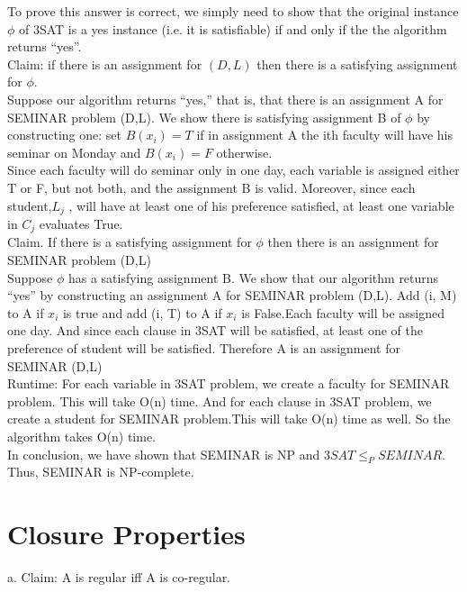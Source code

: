\documentclass[12pt]{article}
\begin{document}
To prove this answer is correct, we simply need to show that the original instance $\phi$ of 3SAT is a yes instance (i.e. it is satisfiable) if and only if the the algorithm returns “yes”.\\

Claim: if there is an assignment for $(D,L)$ then there is a satisfying assignment for $\phi$.\\
Suppose our algorithm returns “yes,” that is, that there is an assignment A for SEMINAR problem (D,L). We show there is satisfying assignment B of $\phi$ by constructing one: set $B(x_i) = T $ if in assignment A the ith faculty will have his seminar on Monday and $B(x_i) = F$ otherwise.\\
Since each faculty will do seminar only in one day, each variable is assigned either T or F, but not both, and the assignment B is valid. Moreover, since each student,$L_j$ , will have at least one of his preference satisfied, at least one variable in $C_j$ evaluates True.\\


Claim. If there is a satisfying assignment for $\phi$ then there is an assignment for SEMINAR problem (D,L)\\
Suppose $\phi$ has a satisfying assignment B. We show that our algorithm returns “yes” by constructing an assignment A for SEMINAR problem (D,L). Add (i, M) to A if $x_i$ is true  and add (i, T) to A if $x_i$ is False.Each faculty will be assigned one day. And since each clause in 3SAT will be satisfied, at least one of the preference of student will be satisfied. Therefore A is an assignment for SEMINAR (D,L)\\

Runtime: For each variable in 3SAT problem, we create a faculty for SEMINAR problem. This will take O(n) time. And for each clause in 3SAT problem, we create a student for SEMINAR problem.This will take O(n) time as well. So the algorithm takes O(n) time.\\

In conclusion, we have shown that SEMINAR is NP and $3SAT \le_P SEMINAR$. Thus, SEMINAR is NP-complete.


\pagebreak

\section{Closure Properties}

a.  Claim: A is regular iff A is co-regular.\\
\end{document}
